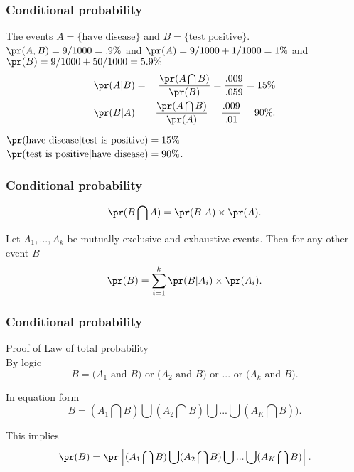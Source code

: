 \begin{frame}[fragile]\frametitle{Conditional probability}

The events $A = \{\mbox{have disease}\}$ and $B = \{\mbox{test
  positive}\}$. \\ 
$\pr(A,B) = 9/1000 = .9\%$ and $\pr(A) = 9/1000+1/1000 = 1\%$ and 
$\pr(B) = 9/1000+50/1000 = 5.9\%$ \\ 
\begin{eqnarray*}
\pr(A|B) & = & \frac{\pr(A \bigcap B)}{\pr(B)} = \frac{.009}{.059}= 15\% \\
\pr(B|A) & = & \frac{\pr(A \bigcap B)}{\pr(A)} = \frac{.009}{.01} =
90\%.
\end{eqnarray*} 

$\pr(\mbox{have disease}|\mbox{test is positive}) = 15\%$ \\
$\pr(\mbox{test is positive}|\mbox{have disease}) = 90\%$.

\end{frame}


\begin{frame}[fragile]\frametitle{Conditional probability}

\begin{prop}
$$\pr(B \bigcap A) = \pr(B |A) \times \pr(A).$$
\end{prop} 


\begin{prop}
Let $A_1,...,A_k$ be mutually exclusive and exhaustive events. Then
for any other event $B$
$$\pr(B) = \sum_{i=1}^k \pr(B |A_i) \times \pr(A_i).$$
\end{prop}

\end{frame}

\begin{frame}[fragile]\frametitle{Conditional probability}

Proof of Law of total probability \\ 

By logic \\
$$B = \mbox{($A_1$ and $B$) or ($A_2$ and $B$) or ... or ($A_k$ and  $B$)}.$$ 

In equation form
$$B = (A_1 \bigcap B) \bigcup (A_2 \bigcap B) \bigcup ... \bigcup (A_K
\bigcap B)).$$ 

This implies
$$\pr(B) = \pr \left[(A_1 \bigcap B) \bigcup (A_2 \bigcap B) \bigcup
    ... \bigcup (A_K \bigcap B)\right].$$ 

\end{frame}

